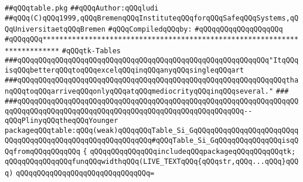 \label{src/lib/tk/src/toolkit/table.pkg}
\verb|##qQQqtable.pkg|\newline
\verb|##qQQqAuthor:qQQqludi|\newline
\verb|##qQQq(C)qQQq1999,qQQqBremenqQQqInstituteqQQqforqQQqSafeqQQqSystems,qQQqUniversitaetqQQqBremen|\newline
\newline
\verb|#qQQqCompiledqQQqby:|\newline
\verb|#qQQqqQQqqQQqqQQqqQQq|\newline
\newline
\newline
\newline
\verb|#qQQqqQQq**************************************************************************|\newline
\verb|#qQQqtk-Tables|\newline
\newline
\newline
\newline
\verb|###qQQqqQQqqQQqqQQqqQQqqQQqqQQqqQQqqQQqqQQqqQQqqQQqqQQqqQQqqQQq"ItqQQqisqQQqbetterqQQqtoqQQqexcelqQQqinqQQqanyqQQqsingleqQQqart|\newline
\verb|###qQQqqQQqqQQqqQQqqQQqqQQqqQQqqQQqqQQqqQQqqQQqqQQqqQQqqQQqqQQqqQQqthanqQQqtoqQQqarriveqQQqonlyqQQqatqQQqmediocrityqQQqinqQQqseveral."|\newline
\verb|###|\newline
\verb|###qQQqqQQqqQQqqQQqqQQqqQQqqQQqqQQqqQQqqQQqqQQqqQQqqQQqqQQqqQQqqQQqqQQqqQQqqQQqqQQqqQQqqQQqqQQqqQQqqQQqqQQqqQQqqQQqqQQqqQQqqQQq--qQQqPlinyqQQqtheqQQqYounger|\newline
\newline
\newline
\newline
\verb|packageqQQqtable:qQQq(weak)qQQqqQQqTable_Si_GqQQqqQQqqQQqqQQqqQQqqQQqqQQqqQQqqQQqqQQqqQQqqQQqqQQqqQQqqQQq#qQQqTable_Si_GqQQqqQQqqQQqqQQqisqQQqfromqQQqqQQqqQQq|\newline
\verb|{|\newline
\verb|qQQqqQQqqQQqqQQqincludeqQQqpackageqQQqqQQqqQQqtk;|\newline
\newline
\verb|qQQqqQQqqQQqqQQqfunqQQqwidthqQQq(LIVE_TEXTqQQq{qQQqstr,qQQq...qQQq}qQQq)|\newline
\verb|qQQqqQQqqQQqqQQqqQQqqQQqqQQqqQQq=|\newline
